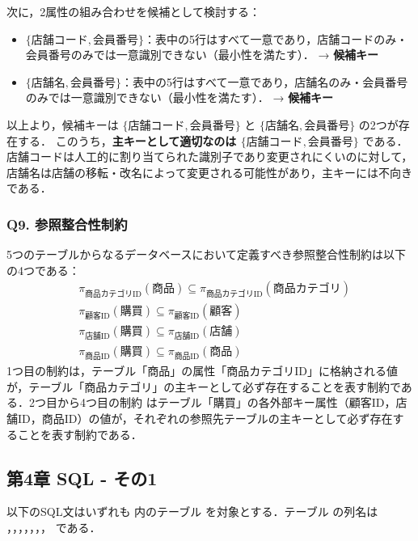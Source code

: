 次に，2属性の組み合わせを候補として検討する：
\begin{itemize}
    \item $\{\text{店舗コード}, \text{会員番号}\}$：表中の5行はすべて一意であり，店舗コードのみ・会員番号のみでは一意識別できない（最小性を満たす）． → \textbf{候補キー}
    \item $\{\text{店舗名}, \text{会員番号}\}$：表中の5行はすべて一意であり，店舗名のみ・会員番号のみでは一意識別できない（最小性を満たす）． → \textbf{候補キー}
\end{itemize}

以上より，候補キーは $\{\text{店舗コード}, \text{会員番号}\}$ と $\{\text{店舗名}, \text{会員番号}\}$ の2つが存在する．
このうち，\textbf{主キーとして適切なのは $\{\text{店舗コード}, \text{会員番号}\}$} である．
店舗コードは人工的に割り当てられた識別子であり変更されにくいのに対して，店舗名は店舗の移転・改名によって変更される可能性があり，主キーには不向きである．


\subsubsection*{Q9. 参照整合性制約}
5つのテーブルからなるデータベースにおいて定義すべき参照整合性制約は以下の4つである：
\begin{align*}
&\pi_{\text{商品カテゴリID}}(\textbf{商品}) \subseteq \pi_{\text{商品カテゴリID}}(\textbf{商品カテゴリ}) \\
&\pi_{\text{顧客ID}}(\textbf{購買}) \subseteq \pi_{\text{顧客ID}}(\textbf{顧客}) \\
&\pi_{\text{店舗ID}}(\textbf{購買}) \subseteq \pi_{\text{店舗ID}}(\textbf{店舗}) \\
&\pi_{\text{商品ID}}(\textbf{購買}) \subseteq \pi_{\text{商品ID}}(\textbf{商品})
\end{align*}
1つ目の制約は，テーブル「商品」の属性「商品カテゴリID」に格納される値が，テーブル「商品カテゴリ」の主キーとして必ず存在することを表す制約である．2つ目から4つ目の制約 はテーブル「購買」の各外部キー属性（顧客ID，店舗ID，商品ID）の値が，それぞれの参照先テーブルの主キーとして必ず存在することを表す制約である．


\subsection*{第4章 SQL - その1}

以下のSQL文はいずれも  内のテーブル  を対象とする．テーブル  の列名は ，，，，，，， である．

